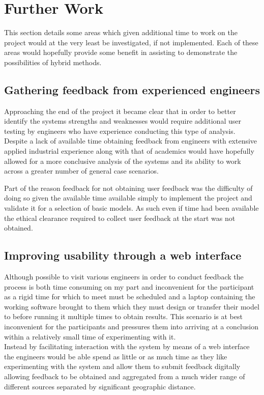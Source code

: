 
\section{Further Work}
This section details some areas which given additional time to work on the project would at the very least be investigated, if not implemented. Each of these areas would hopefully provide some benefit in assisting to demonstrate the possibilities of hybrid methods.

\subsection{Gathering feedback from experienced engineers}
Approaching the end of the project it became clear that in order to better identify the systems strengths and weaknesses would require additional user testing by engineers who have experience conducting this type of analysis. Despite a lack of available time obtaining feedback from engineers with extensive applied industrial experience along with that of academics would have hopefully allowed for a more conclusive analysis of the systems and its ability to work across a greater number of general case scenarios. 

Part of the reason feedback for not obtaining user feedback was the difficulty of doing so given the available time available simply to implement the project and validate it for a selection of basic models. As such even if time had been available the ethical clearance required to collect user feedback at the start was not obtained.


\subsection{Improving usability through a web interface}
Although possible to visit various engineers in order to conduct feedback the process is both time consuming on my part and inconvenient for the participant as a rigid time for which to meet must be scheduled and a laptop containing the working software brought to them which they must design or transfer their model to before running it multiple times to obtain results. This scenario is at best inconvenient for the participants and pressures them into arriving at a conclusion within a relatively small time of experimenting with it. \\ 

\noindent
Instead by facilitating interaction with the system by means of a web interface the engineers would be able spend as little or as much time as they like experimenting with the system and allow them to submit feedback digitally allowing feedback to be obtained and aggregated from a much wider range of different sources separated by significant geographic distance. \\\ 

